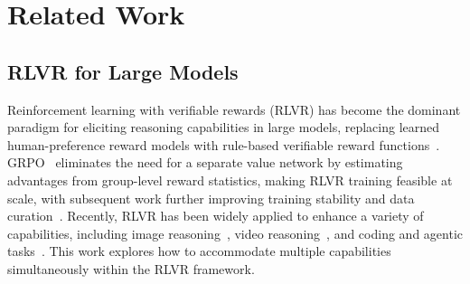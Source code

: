 \section{Related Work}
\label{sec:related}
\subsection{RLVR for Large Models}
Reinforcement learning with verifiable rewards (RLVR) has become the dominant paradigm for eliciting reasoning capabilities in large models, replacing learned human-preference reward models with rule-based verifiable reward functions~\cite{deepseekr1,openai2024openaio1card,yu2026knowrlboostingllmreasoning,dai2025sgrpoearlyexitreinforcement}. GRPO~\cite{grpo} eliminates the need for a separate value network by estimating advantages from group-level reward statistics, making RLVR training feasible at scale, with subsequent work further improving training stability and data curation~\cite{yu2025dapoopensourcellmreinforcement,zheng2025groupsequencepolicyoptimization}. Recently, RLVR has been widely applied to enhance a variety of capabilities, including image reasoning~\cite{huang2026visionr1incentivizingreasoningcapability,yao2025r1sharevlincentivizingreasoningcapability}, video reasoning~\cite{feng2025videor1,wang2025timer1posttraininglargevision}, and coding and agentic tasks~\cite{kimiteam2026kimik25visualagentic,glm5team2026glm5vibecodingagentic}. This work explores how to accommodate multiple capabilities simultaneously within the RLVR framework.

